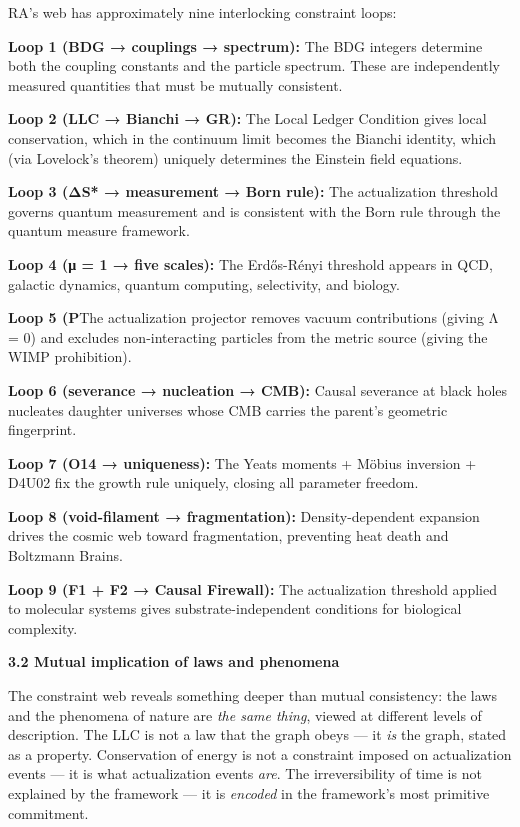 \documentclass[12pt,a4paper]{article}
\begin{document}
RA's web has approximately nine interlocking constraint loops:

\textbf{Loop 1 (BDG → couplings → spectrum):} The BDG integers determine
both the coupling constants and the particle spectrum. These are
independently measured quantities that must be mutually consistent.

\textbf{Loop 2 (LLC → Bianchi → GR):} The Local Ledger Condition gives
local conservation, which in the continuum limit becomes the Bianchi
identity, which (via Lovelock's theorem) uniquely determines the
Einstein field equations.

\textbf{Loop 3 (ΔS* → measurement → Born rule):} The actualization
threshold governs quantum measurement and is consistent with the Born
rule through the quantum measure framework.

\textbf{Loop 4 (μ = 1 → five scales):} The Erdős-Rényi threshold appears
in QCD, galactic dynamics, quantum computing, selectivity, and biology.

\textbf{Loop 5 (P}The actualization projector removes vacuum
contributions (giving Λ = 0) and excludes non-interacting particles from
the metric source (giving the WIMP prohibition).

\textbf{Loop 6 (severance → nucleation → CMB):} Causal severance at
black holes nucleates daughter universes whose CMB carries the parent's
geometric fingerprint.

\textbf{Loop 7 (O14 → uniqueness):} The Yeats moments + Möbius inversion
+ D4U02 fix the growth rule uniquely, closing all parameter freedom.

\textbf{Loop 8 (void-filament → fragmentation):} Density-dependent
expansion drives the cosmic web toward fragmentation, preventing heat
death and Boltzmann Brains.

\textbf{Loop 9 (F1 + F2 → Causal Firewall):} The actualization threshold
applied to molecular systems gives substrate-independent conditions for
biological complexity.

\textbf{3.2 Mutual implication of laws and phenomena}

The constraint web reveals something deeper than mutual consistency: the
laws and the phenomena of nature are \emph{the same thing}, viewed at
different levels of description. The LLC is not a law that the graph
obeys --- it \emph{is} the graph, stated as a property. Conservation of
energy is not a constraint imposed on actualization events --- it is
what actualization events \emph{are}. The irreversibility of time is not
explained by the framework --- it is \emph{encoded} in the framework's
most primitive commitment.
\end{document}
